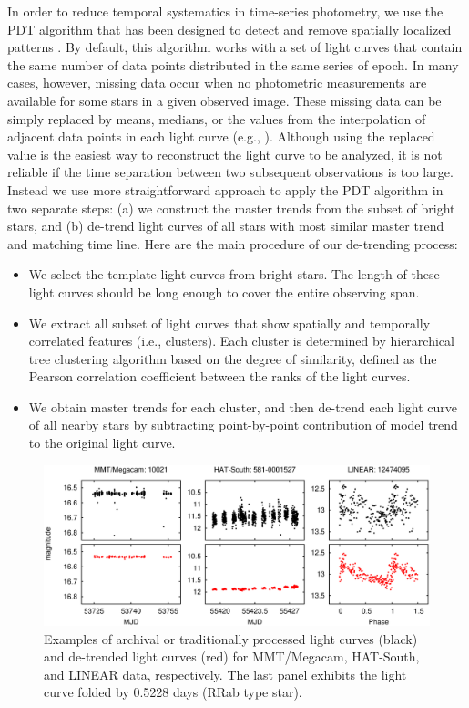 \documentclass[11pt,twoside]{article}
\begin{document}
In order to reduce temporal systematics in time-series photometry, we use the PDT algorithm that has been designed to detect and remove spatially localized patterns \citep{kim09}.  By default, this algorithm works with a set of light curves that contain the same number of data points distributed in the same series of epoch.  In many cases, however, missing data occur when no photometric measurements are available for some stars in a given observed image.  These missing data can be simply replaced by means, medians, or the values from the interpolation of adjacent data points in each light curve (e.g., \citealt{kov05, kim10}).  Although using the replaced value is the easiest way to reconstruct the light curve to be analyzed, it is not reliable if the time separation between two subsequent observations is too large.  Instead we use more straightforward approach to apply the PDT algorithm in two separate steps: (a) we construct the master trends from the subset of bright stars, and (b) de-trend light curves of all stars with most similar master trend and matching time line.  Here are the main procedure of our de-trending process: \begin{itemize}
\item{We select the template light curves from bright stars.  The length of these light curves should be long enough to cover the entire observing span.}

\item{We extract all subset of light curves that show spatially and temporally correlated features (i.e., clusters).  Each cluster is determined by hierarchical tree clustering algorithm based on the degree of similarity, defined as the Pearson correlation coefficient between the ranks of the light curves.}

\item{We obtain master trends for each cluster, and then de-trend each light curve of all nearby stars by subtracting point-by-point contribution of model trend to the original light curve.}
\end{itemize} 

\begin{figure}[!t]
\begin{center}
\includegraphics[scale=0.42]{O07_f2.eps}
\caption{Examples of archival or traditionally processed light curves (black) and de-trended light curves (red) for MMT/Megacam, HAT-South, and LINEAR data, respectively.  The last panel exhibits the light curve folded by 0.5228 days (RRab type star).}
\end{center}
\label{Fig2}
\end{figure}
\end{document}
